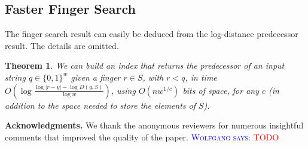 \documentclass[a4paper,11pt]{article}
\newtheorem{theorem}{Theorem}[section]
\newcommand{\?}{\mskip1.5mu}
\newcommand{\aremark}[3]{\textcolor{blue}{\textsc{#1 #2:}}
  \textcolor{red}{\textsf{#3}}}
\newcommand{\wolfgang}[2][says]{\aremark{Wolfgang}{#1}{#2}}
\begin{document}
\subsection{Faster Finger Search}
The finger search result can easily be deduced 
from the log-distance predecessor result. The details are omitted. 
\begin{theorem}
\label{th:finger_faster}
We can build an index that returns the predecessor 
of an input string $q \in \{0, 1\}^w$ given
a finger $r \in S$, with $r < q$, 
in time $O(\log\frac{\log|r - y|-\log D(q, S)}{\log w})$, using  
$O(n w^{1/c})$ bits 
of space, for any $c$ 
(in addition to the space needed to store the elements of $S$).
\end{theorem}



\bigskip
\noindent\textbf{Acknowledgments.}
We thank the anonymous reviewers for numerous
insightful comments that improved the quality of the paper.
\wolfgang{TODO}





\end{document}
